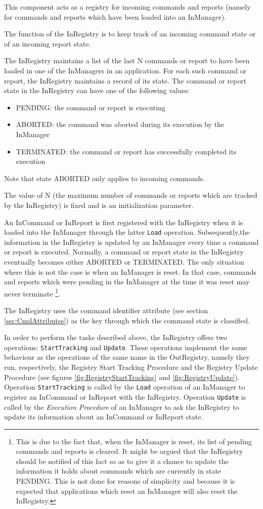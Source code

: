 This component acts as a registry for incoming commands and reports (namely for commands and reports which have been loaded into an InManager).

The function of the InRegistry is to keep track of an incoming command state or of an incoming report state.

The InRegistry maintains a list of the last N commands or report to have been loaded in one of the InManagers in an application. For each such command or report, the InRegistry maintains a record of its state. The command or report state in the InRegistry can have one of the following values:
\begin{itemize}
\item PENDING: the command or report is executing
\item ABORTED: the command was aborted during its execution by the InManager
\item TERMINATED: the command or report has successfully completed its execution
\end{itemize}
Note that state ABORTED only applies to incoming commands.

The value of N (the maximum number of commands or reports which are tracked by the InRegistry) is fixed and is an initialization parameter.

An InCommand or InReport is first registered with the InRegistry when it is loaded into the InManager through the latter \texttt{Load} operation. Subsequently,the information in the InRegistry is updated by an InManager every time a command or report is executed. Normally, a command or report state in the InRegistry eventually becomes either ABORTED or TERMINATED. The only situation where this is not the case is when an InManager is reset. In that case, commands and reports which were pending in the InManager at the time it was reset may never terminate \footnote{This is due to the fact that, when the InManager is reset, its list of pending commands and reports is cleared. It might be argued that the InRegistry should be notified of this fact so as to give it a chance to update the information it holds about commands which are currently in state PENDING. This is not done for reasons of simplicity and because it is expected that applications which reset an InManager will also  reset the InRegistry.}.

The InRegistry uses the command identifier attribute (see section \ref{sec:CmdAttributes}) as the key through which the command state is classified.

In order to perform the tasks described above, the InRegistry offers two operations: \texttt{StartTracking} and \texttt{Update}. These operations implement the same behaviour as the operations of the same name in the OutRegistry, namely they run, respectively, the Registry Start Tracking Procedure and the Registry Update Procedure (see figures \ref{fig:RegistryStartTracking} and \ref{fig:RegistryUpdate}). Operation \texttt{StartTracking} is called by the \texttt{Load} operation of an InManager to register an InCommand or InReport with the InRegistry. Operation \texttt{Update} is called by the \textit{Execution Procedure} of an InManager to ask the InRegistry to update its information about an InCommand or InReport state.


